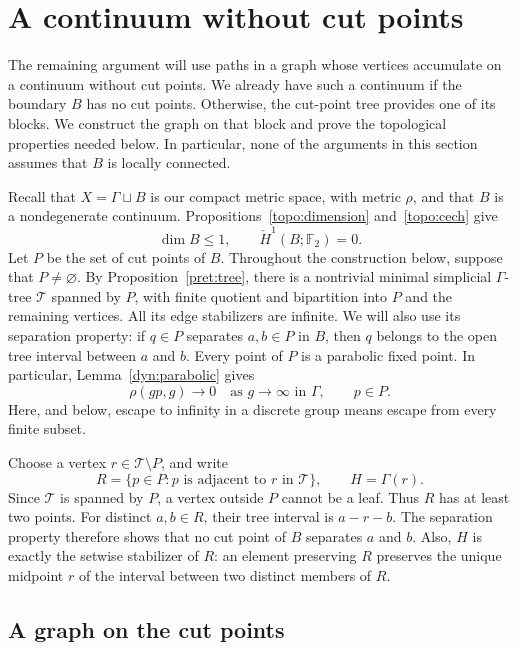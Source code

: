 \section{A continuum without cut points}\label{sec:blocks}

The remaining argument will use paths in a graph whose vertices accumulate
on a continuum without cut points.  We already have such a continuum if
the boundary $B$ has no cut points.  Otherwise, the cut-point tree provides
one of its blocks.  We construct the graph on that block and prove the
topological properties needed below.  In particular, none of the
arguments in this section assumes that $B$ is locally connected.

Recall that $X=\Gamma\sqcup B$ is our compact metric space, with metric
$\rho$, and that $B$ is a nondegenerate continuum.
Propositions~\ref{topo:dimension} and~\ref{topo:cech} give
\[
  \dim B\leq 1,
  \qquad
  \check H^1(B;\mathbb F_2)=0.
\]
Let $P$ be the set of cut points of $B$.  Throughout the construction
below, suppose that $P\ne\varnothing$.  By Proposition~\ref{pret:tree},
there is a nontrivial minimal simplicial $\Gamma$-tree $\mathcal T$
spanned by $P$, with finite quotient and bipartition into $P$ and the
remaining vertices.  All its edge stabilizers are infinite.  We will also
use its separation property: if $q\in P$ separates $a,b\in P$ in $B$,
then $q$ belongs to the open tree interval between $a$ and $b$.
Every point of $P$ is a parabolic fixed point.  In particular,
Lemma~\ref{dyn:parabolic} gives
\begin{equation}\label{block:parabolic-comparison}
  \rho(gp,g)\longrightarrow 0
  \quad\text{as }g\longrightarrow\infty\text{ in }\Gamma,
  \qquad p\in P.
\end{equation}
Here, and below, escape to infinity in a discrete group means escape
from every finite subset.

Choose a vertex $r\in\mathcal T\setminus P$, and write
\[
  R=\{p\in P: p\text{ is adjacent to }r\text{ in }\mathcal T\},
  \qquad H=\Gamma(r).
\]
Since $\mathcal T$ is spanned by $P$, a vertex outside $P$ cannot be a
leaf.  Thus $R$ has at least two points.  For distinct $a,b\in R$, their
tree interval is $a-r-b$.  The separation property therefore shows that
no cut point of $B$ separates $a$ and $b$.  Also, $H$ is exactly the
setwise stabilizer of $R$: an element preserving $R$ preserves the
unique midpoint $r$ of the interval between two distinct members of
$R$.

\subsection{A graph on the cut points}

